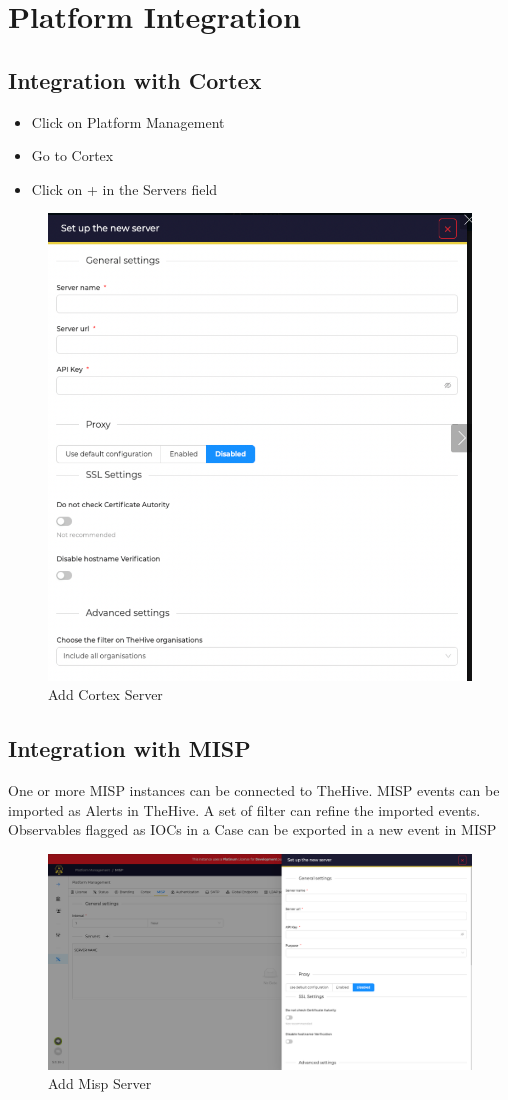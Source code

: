 \documentclass{book}
\begin{document}
\chapter {Platform Integration}
\section{Integration with Cortex}
\begin{itemize}
    \item Click on Platform Management
    \item Go to Cortex
    \item Click on + in the Servers field
\end{itemize}

\begin{figure}[h]
    \centering
    \includegraphics[width=0.6\linewidth]{Integrations Images/cortex setup.png}
    \caption{Add Cortex Server}
    \label{fig:addcortex}
\end{figure}

\newpage

\section{Integration with MISP}
One or more MISP instances can be connected to TheHive. MISP events can be imported as Alerts in TheHive. A set of filter can refine the imported events. Observables flagged as IOCs in a Case can be exported in a new event in MISP
\begin{figure}[h]
    \centering
    \includegraphics[width=\linewidth]{Integrations Images/platform-management-misp-1.png}
    \caption{Add Misp Server}
    \label{fig:addmisp}
\end{figure}
\newpage
\end{document}
